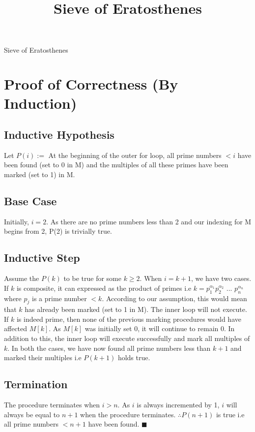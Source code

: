 \documentclass[10pt,a4paper]{article}
\title{Sieve of Eratosthenes}
\date{}
\begin{document}
\maketitle

\begin{algorithm}[H]
	\BlankLine
\caption{Sieve of Eratosthenes}
\end{algorithm}

\section{Proof of Correctness (By Induction)}
	\subsection{Inductive Hypothesis}
	Let $P(i) :=$ At the beginning of the outer for loop, all prime	numbers
	$< i$ have been found (set to 0 in M) and the multiples of all these
	primes have been marked (set to 1) in M.       

	\subsection{Base Case}
	Initially, $i = 2$. As there are no prime numbers less than 2 and our
	indexing for M begins from 2, P(2) is trivially true.

	\subsection{Inductive Step}
	Assume the $P(k)$ to be true for some $k \geq 2$. When $i = k+1$, we have
	two cases. If $k$ is composite, it can expressed as the product of
	primes i.e $k = p_1^{\alpha_{1}} p_2^{\alpha_{2}} \text{ ... } p_n^{\alpha_{n}}$
	where $p_{j}$ is a prime number $< k$. According to our assumption, this would mean
	that $k$ has already been marked (set to 1 in M). The inner loop will not execute.
	\BlankLine
	If $k$ is indeed prime, then none of the previous marking procedures would
	have affected $M[k]$. As $M[k]$ was initially set 0, it will continue to remain 0.
	In addition to this, the inner loop will execute successfully and mark all multiples
	of $k$.	
	\BlankLine
	In both the cases, we have now found all prime numbers less than $k+1$ and marked
	their multiples i.e $P(k+1)$ holds true.

	\subsection{Termination}
	The procedure terminates when $i > n$. As $i$ is always incremented by 1, $i$ will always
	be equal to $n+1$ when the procedure terminates. $\therefore P(n+1)$ is true i.e all prime
	numbers $ < n+1$ have been found. $\blacksquare$
\end{document}
